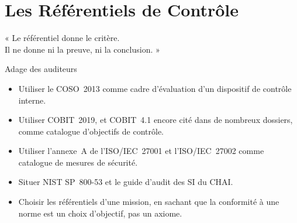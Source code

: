 
\chapter{Les Référentiels de Contrôle}
\label{chap:referentiels}

\epigraph{%
    « Le référentiel donne le critère.\\
    Il ne donne ni la preuve, ni la conclusion. »%
}{Adage des auditeurs}


\begin{boxobjectifs}
\begin{itemize}
    \item Utiliser le COSO~2013 comme cadre d'évaluation d'un dispositif de
          contrôle interne.
    \item Utiliser COBIT~2019, et COBIT~4.1 encore cité dans de nombreux
          dossiers, comme catalogue d'objectifs de contrôle.
    \item Utiliser l'annexe~A de l'ISO/IEC~27001 et l'ISO/IEC~27002 comme
          catalogue de mesures de sécurité.
    \item Situer NIST SP~800-53 et le guide d'audit des SI du CHAI.
    \item Choisir les référentiels d'une mission, en sachant que la
          conformité à une norme est un choix d'objectif, pas un axiome.
\end{itemize}
\end{boxobjectifs}

